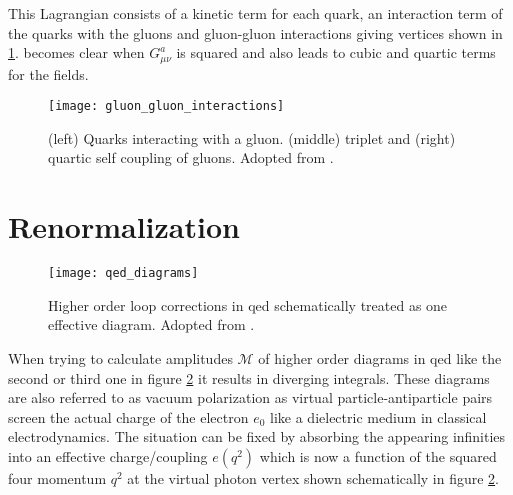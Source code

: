 This Lagrangian consists of a kinetic term for each quark, an interaction term of the quarks with the gluons and gluon-gluon interactions giving vertices shown in \ref{fig:qcd_vertices}. becomes clear when $G^a_{\mu\nu}$ is squared and also leads to cubic and quartic terms for the fields.
\begin{figure}[H]
    \centering
    \texttt{[image: gluon\_gluon\_interactions]}
    \caption[]{(left) Quarks interacting with a gluon. (middle) triplet and (right) quartic self coupling of gluons. Adopted from \citep{thomson2013modern}.}
    \label{fig:qcd_vertices}
\end{figure}

\section{Renormalization}
\begin{figure}
    \centering
    \texttt{[image: qed\_diagrams]}
    \caption[]{Higher order loop corrections in \ac{qed} schematically treated as one effective diagram. Adopted from \citep{thomson2013modern}.}
    \label{fig:qed_diagrams}
\end{figure}
When trying to calculate amplitudes $\mathcal{M}$ of higher order diagrams in \ac{qed} like the second or third one in figure \ref{fig:qed_diagrams} it results in diverging integrals. These diagrams are also referred to as vacuum polarization as virtual particle-antiparticle pairs screen the actual charge of the electron $e_0$ like a dielectric medium in classical electrodynamics. The situation can be fixed by absorbing the appearing infinities into an effective charge/coupling $e(q^2)$ which is now a function of the squared four momentum $q^2$ at the virtual photon vertex shown schematically in figure \ref{fig:qed_diagrams}.

